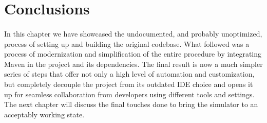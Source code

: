 \section{Conclusions}
\paragraph{}
In this chapter we have showcased the undocumented, and probably unoptimized, process of setting up and building the original codebase. What followed was a process of modernization and simplification of the entire procedure by integrating Maven in the project and its dependencies. The final result is now a much simpler series of steps that offer not only a high level of automation and customization, but completely decouple the project from its outdated IDE choice and opens it up for seamless collaboration from developers using different tools and settings. The next chapter will discuss the final touches done to bring the simulator to an acceptably working state.